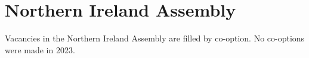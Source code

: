 \documentclass[a4paper,openany]{book}
\begin{document}
\section{Northern Ireland Assembly}

Vacancies in the Northern Ireland Assembly are filled by co-option.
No co-options were made in 2023.
%

%
%
\end{document}
